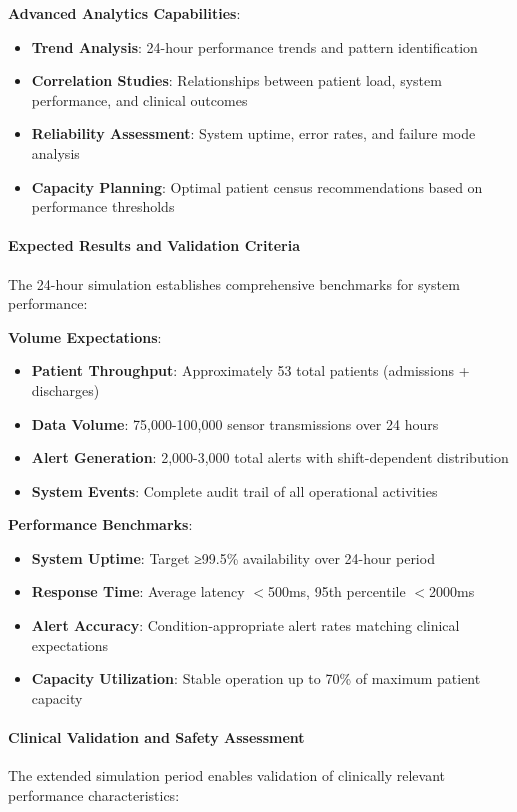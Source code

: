 \textbf{Advanced Analytics Capabilities}:
\begin{itemize}
    \item \textbf{Trend Analysis}: 24-hour performance trends and pattern identification
    \item \textbf{Correlation Studies}: Relationships between patient load, system performance, and clinical outcomes
    \item \textbf{Reliability Assessment}: System uptime, error rates, and failure mode analysis
    \item \textbf{Capacity Planning}: Optimal patient census recommendations based on performance thresholds
\end{itemize}

\paragraph{Expected Results and Validation Criteria}
The 24-hour simulation establishes comprehensive benchmarks for system performance:

\textbf{Volume Expectations}:
\begin{itemize}
    \item \textbf{Patient Throughput}: Approximately 53 total patients (admissions + discharges)
    \item \textbf{Data Volume}: 75,000-100,000 sensor transmissions over 24 hours
    \item \textbf{Alert Generation}: 2,000-3,000 total alerts with shift-dependent distribution
    \item \textbf{System Events}: Complete audit trail of all operational activities
\end{itemize}

\textbf{Performance Benchmarks}:
\begin{itemize}
    \item \textbf{System Uptime}: Target ≥99.5\% availability over 24-hour period
    \item \textbf{Response Time}: Average latency $<$500ms, 95th percentile $<$2000ms
    \item \textbf{Alert Accuracy}: Condition-appropriate alert rates matching clinical expectations
    \item \textbf{Capacity Utilization}: Stable operation up to 70\% of maximum patient capacity
\end{itemize}

\paragraph{Clinical Validation and Safety Assessment}
The extended simulation period enables validation of clinically relevant performance characteristics:

